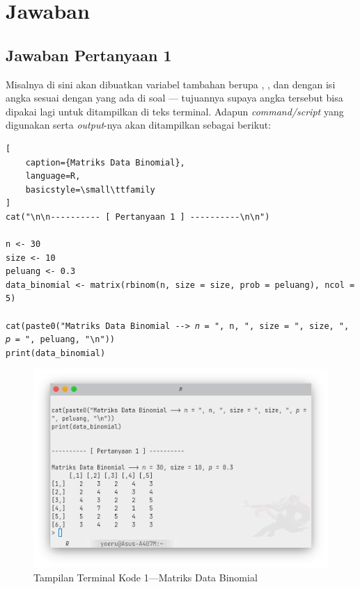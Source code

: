\section{Jawaban}


\subsection{Jawaban Pertanyaan 1}

Misalnya di sini akan dibuatkan variabel tambahan berupa , , dan  dengan isi angka sesuai dengan yang ada di soal --- tujuannya supaya angka tersebut bisa dipakai lagi untuk ditampilkan di teks terminal. Adapun \textit{command/script} yang digunakan serta \textit{output}-nya akan ditampilkan sebagai berikut:

\clearpage

\begin{lstlisting}[
    caption={Matriks Data Binomial}, 
    language=R, 
    basicstyle=\small\ttfamily
]
cat("\n\n---------- [ Pertanyaan 1 ] ----------\n\n")

n <- 30
size <- 10
peluang <- 0.3
data_binomial <- matrix(rbinom(n, size = size, prob = peluang), ncol = 5)

cat(paste0("Matriks Data Binomial --> 𝑛 = ", n, ", size = ", size, ", 𝑝 = ", peluang, "\n"))
print(data_binomial)
\end{lstlisting}

\begin{figure}[H]
    \centering
    \includegraphics[width=.8\linewidth]{image/Matriks Data Binomial.png}
    \vspace{-\baselineskip}
    \caption{Tampilan Terminal Kode 1---Matriks Data Binomial}
\end{figure}

